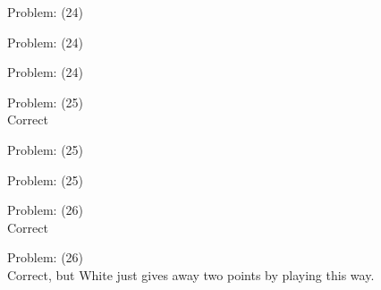 \documentclass[11pt]{article}
\begin{document}
\begin{minipage}[t]{0.5\textwidth}
  {\centering
  
Problem: (24)\\
  }
\end{minipage}
\begin{minipage}[t]{0.5\textwidth}
  {\centering
  
Problem: (24)\\
  }
\end{minipage}
\begin{minipage}[t]{0.5\textwidth}
  {\centering
  
Problem: (24)\\
  }
\end{minipage}
\begin{minipage}[t]{0.5\textwidth}
  {\centering
  
Problem: (25)\\
Correct\\
  }
\end{minipage}
\begin{minipage}[t]{0.5\textwidth}
  {\centering
  
Problem: (25)\\
  }
\end{minipage}
\begin{minipage}[t]{0.5\textwidth}
  {\centering
  
Problem: (25)\\
  }
\end{minipage}
\begin{minipage}[t]{0.5\textwidth}
  {\centering
  
Problem: (26)\\
Correct\\
  }
\end{minipage}
\begin{minipage}[t]{0.5\textwidth}
  {\centering
  
Problem: (26)\\
Correct, but White just gives away two points by playing this way.\\
  }
\end{minipage}
\end{document}
